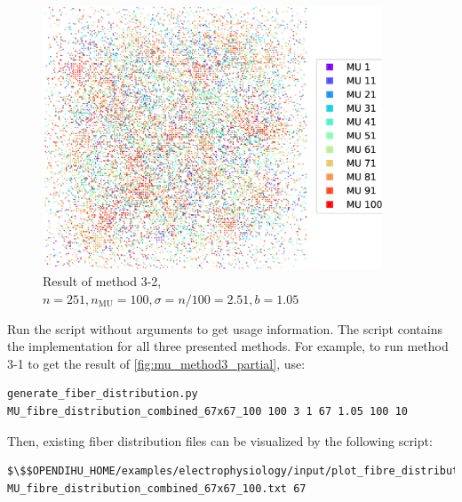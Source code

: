 \begin{figure}%
  \centering
  \includegraphics[width=0.9\textwidth]{images/motor_unit_assignment/MU_fibre_distribution_combined_sparse_251x251_100_2d_fiber_distribution_.png}%
  \caption{Result of method 3-2, $n=251, n_\text{MU}=100, \sigma = n/100 = 2.51, b=1.05$}%
  \label{fig:mu_method3_2}%
\end{figure}%

\begin{reproduce}
  Run the script  without arguments to get usage information.
  The script contains the implementation for all three presented methods. For example, to run method 3-1 to get the result of \cref{fig:mu_method3_partial}, use:
  \begin{lstlisting}[columns=fullflexible,breaklines=true,postbreak=\mbox{\textcolor{gray}{$\hookrightarrow$}\space}]
    generate_fiber_distribution.py MU_fibre_distribution_combined_67x67_100 100 3 1 67 1.05 100 10
  \end{lstlisting}
  Then, existing fiber distribution files can be visualized by the following script:
  \begin{lstlisting}[columns=fullflexible,breaklines=true,postbreak=\mbox{\textcolor{gray}{$\hookrightarrow$}\space}]
    $\$$OPENDIHU_HOME/examples/electrophysiology/input/plot_fibre_distribution_2d.py MU_fibre_distribution_combined_67x67_100.txt 67
  \end{lstlisting}
\end{reproduce}

